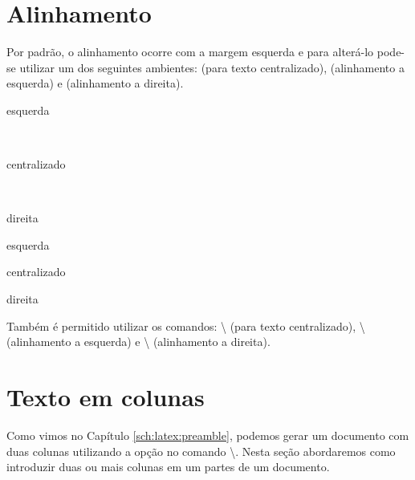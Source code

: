 \section{Alinhamento}
Por padrão, o alinhamento ocorre com a margem esquerda e para alterá-lo pode-se utilizar um dos seguintes ambientes:  (para texto centralizado),  (alinhamento a esquerda) e  (alinhamento a direita). \\
\begin{minipage}[t]{0.47\linewidth} \vspace{-8pt}
    \begin{latexcode}
        \begin{flushleft}esquerda
        \end{flushleft} \\
        \begin{center}centralizado
        \end{center} \\
        \begin{flushright}direita
        \end{flushright}
    \end{latexcode}
\end{minipage} \hfill
\begin{minipage}[t]{0.47\linewidth} \vspace{0pt}
    \begin{flushleft}esquerda
    \end{flushleft}
    \begin{center}centralizado
    \end{center}
    \begin{flushright}direita
    \end{flushright}
\end{minipage}

Também é permitido utilizar os comandos: \textbackslash{} (para texto centralizado), \textbackslash{} (alinhamento a esquerda) e \textbackslash{} (alinhamento a direita).

\section{Texto em colunas}
Como vimos no Capítulo \ref{sch:latex:preamble}, podemos gerar um documento com duas colunas utilizando a opção  no comando \textbackslash{}. Nesta seção abordaremos como introduzir duas ou mais colunas em um partes de um documento.

